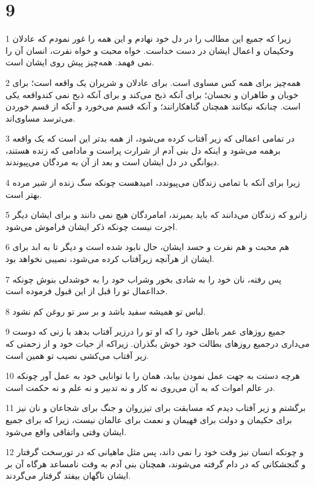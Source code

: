 \chapter{9}

\par 1 زیرا که جمیع این مطالب را در دل خود نهادم و این همه را غور نمودم که عادلان وحکیمان و اعمال ایشان در دست خداست. خواه محبت و خواه نفرت، انسان آن را نمی فهمد. همه‌چیز پیش روی ایشان است.
\par 2 همه‌چیز برای همه کس مساوی است. برای عادلان و شریران یک واقعه است؛ برای خوبان و طاهران و نجسان؛ برای آنکه ذبح می‌کند و برای آنکه ذبح نمی کندواقعه یکی است. چنانکه نیکانند همچنان گناهکارانند؛ و آنکه قسم می‌خورد و آنکه از قسم خوردن می‌ترسد مساوی‌اند.
\par 3 در تمامی اعمالی که زیر آفتاب کرده می‌شود، از همه بدتر این است که یک واقعه برهمه می‌شود و اینکه دل بنی آدم از شرارت پراست و مادامی که زنده هستند، دیوانگی در دل ایشان است و بعد از آن به مردگان می‌پیوندند.
\par 4 زیرا برای آنکه با تمامی زندگان می‌پیوندد، امیدهست چونکه سگ زنده از شیر مرده بهتر است.
\par 5 زانرو که زندگان می‌دانند که باید بمیرند، امامردگان هیچ نمی دانند و برای ایشان دیگر اجرت نیست چونکه ذکر ایشان فراموش می‌شود.
\par 6 هم محبت و هم نفرت و حسد ایشان، حال نابود شده است و دیگر تا به ابد برای ایشان از هر‌آنچه زیرآفتاب کرده می‌شود، نصیبی نخواهد بود.
\par 7 پس رفته، نان خود را به شادی بخور وشراب خود را به خوشدلی بنوش چونکه خدااعمال تو را قبل از این قبول فرموده است. 
\par 8 لباس تو همیشه سفید باشد و بر سر تو روغن کم نشود.
\par 9 جمیع روزهای عمر باطل خود را که او تو را درزیر آفتاب بدهد با زنی که دوست می‌داری درجمیع روزهای بطالت خود خوش بگذران. زیراکه از حیات خود و از زحمتی که زیر آفتاب می‌کشی نصیب تو همین است.
\par 10 هر‌چه دستت به جهت عمل نمودن بیابد، همان را با توانایی خود به عمل آور چونکه در عالم اموات که به آن می‌روی نه کار و نه تدبیر و نه علم و نه حکمت است.
\par 11 برگشتم و زیر آفتاب دیدم که مسابقت برای تیزروان و جنگ برای شجاعان و نان نیز برای حکیمان و دولت برای فهیمان و نعمت برای عالمان نیست، زیرا که برای جمیع ایشان وقتی واتفاقی واقع می‌شود.
\par 12 و چونکه انسان نیز وقت خود را نمی داند، پس مثل ماهیانی که در تورسخت گرفتار و گنجشکانی که در دام گرفته می‌شوند، همچنان بنی آدم به وقت نامساعد هرگاه آن بر ایشان ناگهان بیفتد گرفتار می‌گردند.
